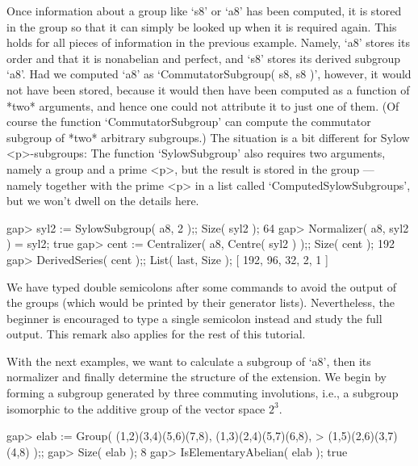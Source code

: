 Once information about a group like `s8' or `a8' has been computed, it
is stored in the group so that  it can simply be looked  up when it is
required  again.   This holds for  all pieces   of  information in the
previous  example.  Namely,  `a8'  stores its  order and  that   it is
nonabelian  and perfect,  and `s8'  stores its  derived subgroup `a8'.
Had we computed `a8' as  `CommutatorSubgroup( s8,  s8 )', however,  it
would not have been stored,  because it would  then have been computed
as a function of *two* arguments, and hence one could not attribute it
to just one of them. (Of course  the function `CommutatorSubgroup' can
compute the commutator  subgroup  of *two* arbitrary  subgroups.)  The
situation is  a bit  different for  Sylow  <p>-subgroups: The function
`SylowSubgroup' also  requires  two arguments,  namely a   group and a
prime <p>, but the result is  stored in the  group --- namely together
with the prime  <p> in a  list called `ComputedSylowSubgroups', but we
won't dwell on the details here.

\beginexample
gap> syl2 := SylowSubgroup( a8, 2 );; Size( syl2 );
64
gap> Normalizer( a8, syl2 ) = syl2;
true
gap> cent := Centralizer( a8, Centre( syl2 ) );; Size( cent );
192
gap> DerivedSeries( cent );; List( last, Size );
[ 192, 96, 32, 2, 1 ]
\endexample

We have typed double semicolons  after some commands  to avoid the output
of the  groups   (which would  be  printed  by their  generator   lists).
Nevertheless, the beginner  is  encouraged to   type  a single  semicolon
instead and study the full output. This  remark also applies for the rest
of this tutorial.

With the next  examples, we want  to calculate a  subgroup of `a8', then
its  normalizer and finally determine the  structure of the extension. We
begin by forming a subgroup   generated by three commuting   involutions,
i.e., a subgroup  isomorphic to the   additive group of the  vector space
$2^3$.

\beginexample
gap> elab := Group( (1,2)(3,4)(5,6)(7,8), (1,3)(2,4)(5,7)(6,8),
>                   (1,5)(2,6)(3,7)(4,8) );;
gap> Size( elab );
8
gap> IsElementaryAbelian( elab );
true
\endexample

